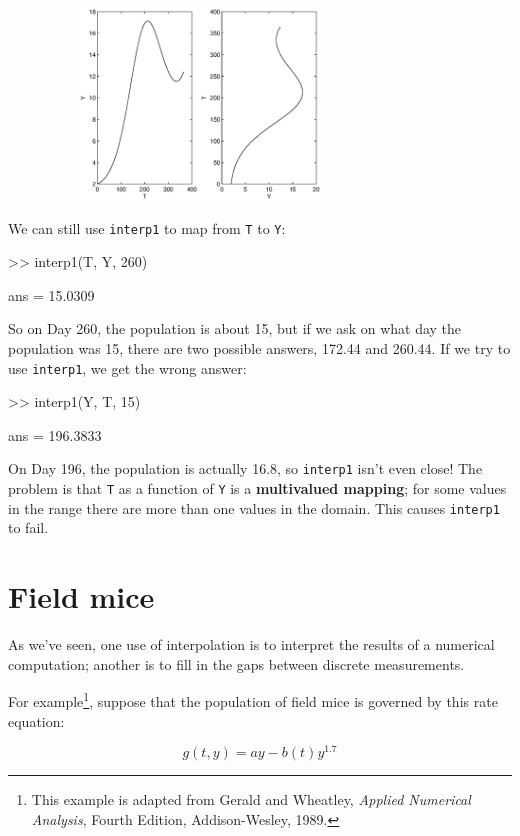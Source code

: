 \documentclass[
]{book}
\numberwithin{Answer}{chapter}
\numberwithin{Exercise}{chapter}
\begin{document}
\beforefig
\centerline{\includegraphics[height=2in,width=4in]{figs/ratplot2.eps}}

We can still use {\tt interp1} to map from {\tt T} to {\tt Y}:

\begin{code}
>> interp1(T, Y, 260)

ans = 15.0309
\end{code}

So on Day 260, the population is about 15, but if we ask on what
day the population was 15, there are two possible answers, 172.44
and 260.44.  If we try to use {\tt interp1}, we get the wrong answer:

\begin{code}
>> interp1(Y, T, 15)

ans = 196.3833                %
\end{code}

On Day 196, the population is actually 16.8, so {\tt interp1} isn't
even close!  The problem is that {\tt T} as a function of {\tt Y} is a
{\bf multivalued mapping}; for some values in the range there are more
than one values in the domain.  This causes {\tt interp1} to fail.


\section{Field mice}

As we've seen, one use of interpolation is to interpret the results
of a numerical computation; another is to fill in the gaps between
discrete measurements.

For example\footnote{This example is adapted from Gerald and Wheatley,
{\em Applied Numerical Analysis}, Fourth Edition, Addison-Wesley,
1989.}, suppose that the population of field mice is governed by this
rate equation:

\begin{equation}
g(t, y) = ay - b(t) y^{1.7}
\end{equation}
\end{document}
